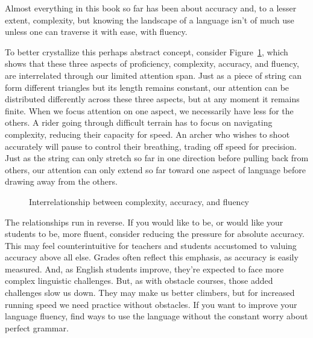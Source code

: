 Almost everything in this book so far has been about accuracy and, to a lesser extent, complexity, but knowing the landscape of a language isn't of much use unless one can traverse it with ease, with fluency.

To better crystallize this perhaps abstract concept, consider Figure~\ref{fig:CAFtriangle}, which shows that these three aspects of proficiency, complexity, accuracy, and fluency, are interrelated through our limited attention span. Just as a piece of string can form different triangles but its length remains constant, our attention can be distributed differently across these three aspects, but at any moment it remains finite. When we focus attention on one aspect, we necessarily have less for the others. A rider going through difficult terrain has to focus on navigating complexity, reducing their capacity for speed. An archer who wishes to shoot accurately will pause to control their breathing, trading off speed for precision. Just as the string can only stretch so far in one direction before pulling back from others, our attention can only extend so far toward one aspect of language before drawing away from the others.

\begin{figure}
\caption{Interrelationship between complexity, accuracy, and fluency}
\label{fig:CAFtriangle}
\end{figure}


The relationships run in reverse. If you would like to be, or would like your students to be, more fluent, consider reducing the pressure for absolute accuracy. This may feel counterintuitive for teachers and students accustomed to valuing accuracy above all else. Grades often reflect this emphasis, as accuracy is easily measured. And, as English students improve, they're expected to face more complex linguistic challenges. But, as with obstacle courses, those added challenges slow us down. They may make us better climbers, but for increased running speed we need practice without obstacles. If you want to improve your language fluency, find ways to use the language without the constant worry about perfect grammar.

